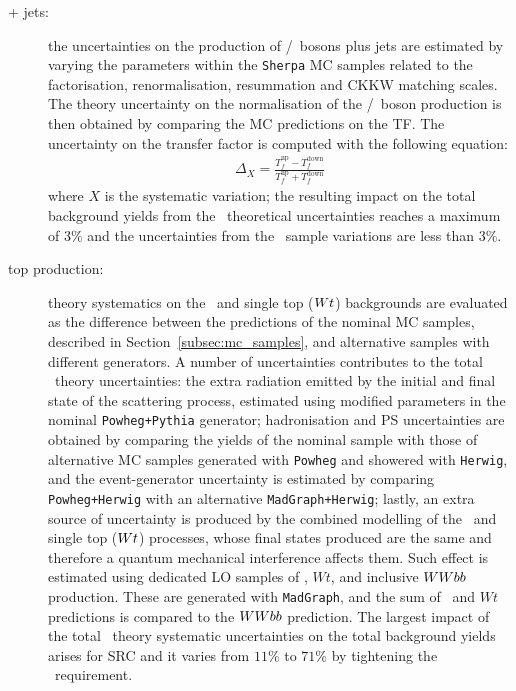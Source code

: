 			\begin{description}
				\item [ + jets:] the uncertainties on the production of \Wboson/\Zboson\ bosons plus jets are estimated by varying the parameters within the \texttt{Sherpa} \ac{MC} samples related to the factorisation, renormalisation, resummation and \ac{CKKW} matching scales. The theory uncertainty on the normalisation of the \Wboson/\Zboson\ boson production is then obtained by comparing the \ac{MC} predictions on the \ac{TF}. The uncertainty on the transfer factor is computed with the following equation: 
				\begin{eqnarray}
    				\Delta_{X} = \frac{T_f^{\mathrm{up}} - T_f^{\mathrm{down}}}{T_f^{\mathrm{up}} + T_f^{\mathrm{down}}}
    			\label{eq:theory_uncertainty}
				\end{eqnarray}
				\noindent where $X$ is the systematic variation; the resulting impact on the total background yields from the \Zjets\ theoretical uncertainties reaches a maximum of $3\%$ and the uncertainties from the \Wjets\ sample variations are less than $3\%$.

				\item [top production:] theory systematics on the \ttbar\ and single top ($W t$) backgrounds are evaluated as the difference between the predictions of the nominal \ac{MC} samples, described in Section~\ref{subsec:mc_samples}, and alternative samples with different generators. A number of uncertainties contributes to the total \ttbar\ theory uncertainties: the extra radiation emitted by the initial and final state of the scattering process, estimated using modified parameters in the nominal \texttt{Powheg+Pythia} generator; hadronisation and \ac{PS} uncertainties are obtained by comparing the yields of the nominal sample with those of alternative \ac{MC} samples generated with \texttt{Powheg} and showered with \texttt{Herwig}, and the event-generator uncertainty is estimated by comparing \texttt{Powheg+Herwig} with an alternative \texttt{MadGraph+Herwig}; lastly, an extra source of uncertainty is produced by the combined modelling of the \ttbar\ and single top ($W t$) processes, whose final states produced are the same and therefore a quantum mechanical interference affects them. Such effect is estimated using dedicated \ac{LO} samples of \ttbar, $Wt$, and inclusive $WW bb$ production. These are generated with \texttt{MadGraph}, and the sum of \ttbar\ and $Wt$ predictions is compared to the $WW bb$ prediction. The largest impact of the total \ttbar\ theory systematic uncertainties on the total background yields arises for SRC and it varies from $11\%$ to $71\%$ by tightening the \rISR\ requirement.


\end{description}

